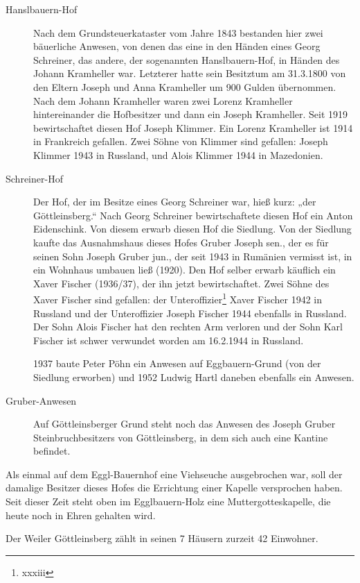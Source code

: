 \documentclass{book}
\begin{document}
\begin{description}
\item[Hanslbauern-Hof] Nach dem Grundsteuerkataster vom Jahre 1843
bestanden hier zwei bäuerliche Anwesen, von denen das eine in den Händen
eines Georg Schreiner, das andere, der sogenannten Hanslbauern-Hof, in
Händen des Johann Kramheller war. Letzterer hatte sein Besitztum am
31.3.1800 von den Eltern Joseph und Anna Kramheller um 900 Gulden
übernommen. Nach dem Johann Kramheller waren zwei Lorenz Kramheller
hintereinander die Hofbesitzer und dann ein Joseph Kramheller. Seit 1919
bewirtschaftet diesen Hof Joseph Klimmer. Ein Lorenz Kramheller ist 1914
in Frankreich gefallen. Zwei Söhne von Klimmer sind gefallen: Joseph
Klimmer 1943 in Russland, und Alois Klimmer 1944 in Mazedonien.

\item[Schreiner-Hof] Der Hof, der im Besitze eines Georg Schreiner war,
hieß kurz: „der Göttleinsberg.“ Nach Georg Schreiner bewirtschaftete
diesen Hof ein Anton Eidenschink. Von diesem erwarb diesen Hof die
Siedlung. Von der Siedlung kaufte das Ausnahmshaus dieses Hofes Gruber
Joseph sen., der es für seinen Sohn Joseph Gruber jun., der seit 1943 in
Rumänien vermisst ist, in ein Wohnhaus umbauen ließ (1920). Den Hof
selber erwarb käuflich ein Xaver Fischer (1936/37), der ihn jetzt
bewirtschaftet. Zwei Söhne des Xaver Fischer sind gefallen: der
Unteroffizier\footnote{xxxiii} Xaver Fischer 1942 in Russland und der
Unteroffizier Joseph Fischer 1944 ebenfalls in Russland. Der Sohn Alois
Fischer hat den rechten Arm verloren und der Sohn Karl Fischer ist
schwer verwundet worden am 16.2.1944 in Russland.

1937 baute Peter Pöhn ein Anwesen auf Eggbauern-Grund (von der Siedlung
erworben) und 1952 Ludwig Hartl daneben ebenfalls ein Anwesen.

\item[Gruber-Anwesen] Auf Göttleinsberger Grund steht noch das Anwesen
des Joseph Gruber Steinbruchbesitzers von Göttleinsberg, in dem sich
auch eine Kantine befindet.
\end{description}

Als einmal auf dem Eggl-Bauernhof eine Viehseuche ausgebrochen war, soll
der damalige Besitzer dieses Hofes die Errichtung einer Kapelle
versprochen haben. Seit dieser Zeit steht oben im Egglbauern-Holz eine
Muttergotteskapelle, die heute noch in Ehren gehalten wird.

Der Weiler Göttleinsberg zählt in seinen 7 Häusern zurzeit 42 Einwohner.
\end{document}
